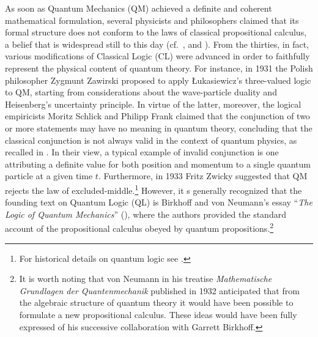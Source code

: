 \documentclass[11pt, executivepaper]{article}
\begin{document}
As soon as Quantum Mechanics (QM) achieved a definite and coherent mathematical formulation, several physicists and philosophers claimed that its formal structure does not conform to the laws of classical propositional calculus, a belief that is widespread still to this day (cf.\ \cite{Giuntini:2002}, \cite{DallaChiara:2004} and \cite{deRonde:2016}). From the thirties, in fact, various modifications of Classical Logic (CL) were advanced in order to faithfully represent the physical content of quantum theory. For instance, in 1931 the Polish philosopher Zygmunt Zawirski proposed to apply \L ukasiewicz's three-valued logic to QM, starting from considerations about the wave-particle duality and Heisenberg's uncertainty principle. In virtue of the latter, moreover, the logical empiricists Moritz Schlick and Philipp Frank claimed that the conjunction of two or more statements may have no meaning in quantum theory, concluding that the classical conjunction is not always valid in the context of quantum physics, as recalled in \cite{Carnap:1966}. In their view, a typical example of invalid conjunction is one attributing a definite value for both position and momentum to a single quantum particle at a given time $t$. Furthermore, in 1933 Fritz Zwicky suggested that QM rejects the law of excluded-middle.\footnote{For historical details on quantum logic see \cite{Jammer:1974}.} However, it s generally recognized that 
the founding text on Quantum Logic (QL) is Birkhoff and von Neumann's essay ``\emph{The Logic of Quantum Mechanics}'' (\cite{vonNeumann:1936}), where the authors provided the standard account of the propositional calculus obeyed by quantum propositions.\footnote{It is worth noting that von Neumann in his treatise \emph{Mathematische Grundlagen der Quantenmechanik} published in 1932 anticipated that from the algebraic structure of quantum theory it would have been possible to formulate a new propositional calculus. These ideas would have been fully expressed of his successive collaboration with Garrett Birkhoff.}
\end{document}
